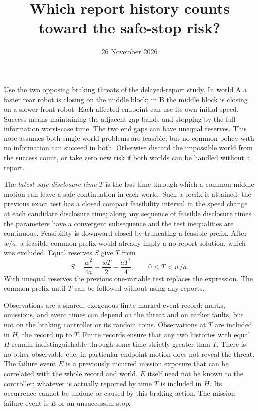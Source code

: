 \documentclass[11pt]{article}
\title{Which report history counts toward the safe-stop risk?}
\author{}
\date{26 November 2026}
\begin{document}
\maketitle

Use the two opposing braking threats of the delayed-report study. In world A a faster rear robot is closing on the middle block; in B the middle block is closing on a slower front robot. Each affected endpoint can use its own initial speed. Success means maintaining the adjacent gap bands and stopping by the full-information worst-case time. The two end gaps can have unequal reserves. This note assumes both single-world problems are feasible, but no common policy with no information can succeed in both. Otherwise discard the impossible world from the success count, or take zero new risk if both worlds can be handled without a report.

The \emph{latest safe disclosure time} $T$ is the last time through which a common middle motion can leave a safe continuation in each world. Such a prefix is attained: the previous exact test has a closed compact feasibility interval in the speed change at each candidate disclosure time; along any sequence of feasible disclosure times the parameters have a convergent subsequence and the test inequalities are continuous. Feasibility is downward closed by truncating a feasible prefix. After $w/a$, a feasible common prefix would already imply a no-report solution, which was excluded. Equal reserves $S$ give $T$ from
\[
 S=\frac{w^2}{4a}+\frac{wT}{2}-\frac{aT^2}{4},\qquad 0\le T<w/a.
\]
With unequal reserves the previous one-variable test replaces the expression. The common prefix until $T$ can be followed without using any reports.

Observations are a shared, exogenous finite marked-event record: marks, omissions, and event times can depend on the threat and on earlier faults, but not on the braking controller or its random coins. Observations at $T$ are included in $H$, the record up to $T$. Finite records ensure that any two histories with equal $H$ remain indistinguishable through some time strictly greater than $T$. There is no other observable cue; in particular endpoint motion does not reveal the threat. The failure event $E$ is a previously incurred mission exposure that can be correlated with the whole record and world. $E$ itself need not be known to the controller; whatever is actually reported by time $T$ is included in $H$. Its occurrence cannot be undone or caused by this braking action. The mission failure event is $E$ or an unsuccessful stop.
\end{document}
